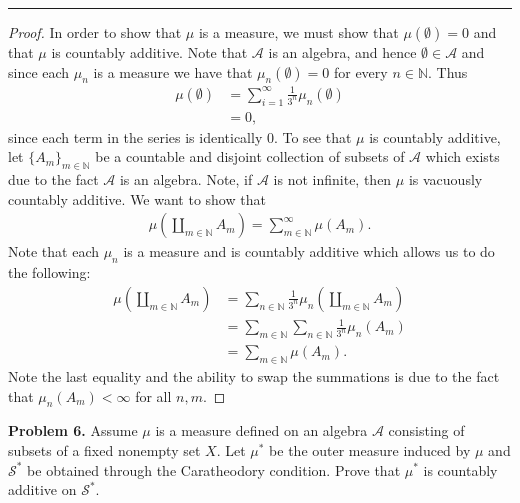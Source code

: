 \documentclass[leqno]{article}
\theoremstyle{nonumberplain}
\newtheorem{proof}{Proof}
\newcommand{\N}{\mathbb{N}}
\begin{document}
\noindent\rule[0.5ex]{\linewidth}{1pt}



\begin{proof}
In order to show that $\mu$ is a measure, we must show that $\mu(\emptyset)=0$ and that $\mu$ is countably additive.  Note that $\mathcal{A}$ is an algebra, and hence $\emptyset\in \mathcal{A}$ and since each $\mu_n$ is a measure we have that $\mu_n(\emptyset)=0$ for every $n\in \N$.  Thus
\begin{align*}
\mu(\emptyset)&=\sum_{i=1}^\infty \frac{1}{3^n}\mu_n(\emptyset)\\
&= 0,
\end{align*}
since each term in the series is identically $0$. To see that $\mu$ is countably additive, let $\{A_m\}_{m\in \N}$ be a countable and disjoint collection of subsets of $\mathcal{A}$ which exists due to the fact $\mathcal{A}$ is an algebra. Note, if $\mathcal{A}$ is not infinite, then $\mu$ is vacuously countably additive.  We want to show that
\begin{align*}
\mu\left( \coprod_{m\in \N} A_m\right) = \sum_{m\in \N}^\infty \mu(A_m).
\end{align*}
Note that each $\mu_n$ is a measure and is countably additive which allows us to do the following:
\begin{align*}
\mu \left( \coprod_{m\in \N} A_m \right) &= \sum_{n\in \N} \frac{1}{3^n} \mu_n \left( \coprod_{m \in \N} A_m\right)\\
&=\sum_{m\in \N}\sum_{n\in \N} \frac{1}{3^n} \mu_n(A_m)\\
&= \sum_{m\in \N} \mu(A_m).
\end{align*}
Note the last equality and the ability to swap the summations is due to the fact that $\mu_n(A_m)<\infty$ for all $n,m$.

\end{proof}

\pagebreak



\noindent\textbf{Problem 6.} \quad
Assume $ \mu $ is a measure defined on an algebra $ \mathcal{A} $
consisting of subsets of a fixed nonempty set $ X $.
Let $ \mu^* $ be the outer measure induced by $ \mu $
and $ \mathcal{S}^* $ be obtained through the Caratheodory condition.
Prove that $ \mu^* $ is countably additive on $ \mathcal{S}^* $.
\end{document}

